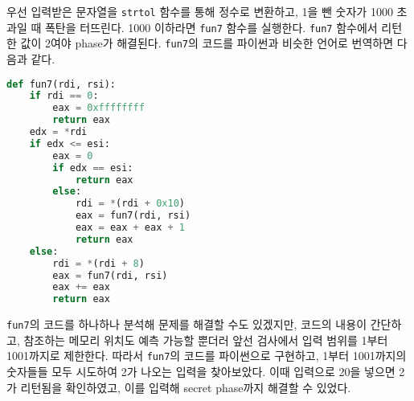 \documentclass{scrartcl}
\begin{document}
우선 입력받은 문자열을 \texttt{strtol} 함수를 통해 정수로 변환하고, 1을 뺀
숫자가 1000 초과일 때 폭탄을 터뜨린다. 1000 이하라면 \texttt{fun7} 함수를
실행한다. \texttt{fun7} 함수에서 리턴한 값이 2여야 phase가 해결된다.
\texttt{fun7}의 코드를 파이썬과 비슷한 언어로 번역하면 다음과 같다.
\begin{lstlisting}[language=Python]
def fun7(rdi, rsi):
    if rdi == 0:
        eax = 0xffffffff
        return eax
    edx = *rdi
    if edx <= esi:
        eax = 0
        if edx == esi:
            return eax
        else:
            rdi = *(rdi + 0x10)
            eax = fun7(rdi, rsi)
            eax = eax + eax + 1
            return eax
    else:
        rdi = *(rdi + 8)
        eax = fun7(rdi, rsi)
        eax += eax
        return eax
\end{lstlisting}
\texttt{fun7}의 코드를 하나하나 분석해 문제를 해결할 수도 있겠지만, 코드의
내용이 간단하고, 참조하는 메모리 위치도 예측 가능할 뿐더러 앞선 검사에서 입력
범위를 1부터 1001까지로 제한한다. 따라서 \texttt{fun7}의 코드를 파이썬으로
구현하고, 1부터 1001까지의 숫자들들 모두 시도하여 2가 나오는 입력을 찾아보았다.
이때 입력으로 20을 넣으면 2가 리턴됨을 확인하였고, 이를 입력해 secret phase까지
해결할 수 있었다.
\end{document}
